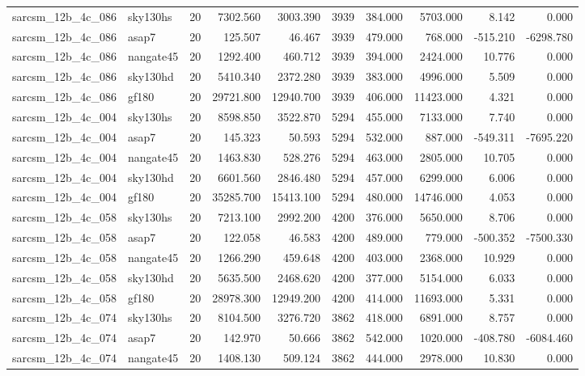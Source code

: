 \documentclass{article}
\begin{document}
\begin{longtable}{llrrrrrrrr}
sarcsm\_12b\_4c\_086 & sky130hs & 20 & 7302.560 & 3003.390 & 3939 & 384.000 & 5703.000 & 8.142 & 0.000 \\
sarcsm\_12b\_4c\_086 & asap7 & 20 & 125.507 & 46.467 & 3939 & 479.000 & 768.000 & -515.210 & -6298.780 \\
sarcsm\_12b\_4c\_086 & nangate45 & 20 & 1292.400 & 460.712 & 3939 & 394.000 & 2424.000 & 10.776 & 0.000 \\
sarcsm\_12b\_4c\_086 & sky130hd & 20 & 5410.340 & 2372.280 & 3939 & 383.000 & 4996.000 & 5.509 & 0.000 \\
sarcsm\_12b\_4c\_086 & gf180 & 20 & 29721.800 & 12940.700 & 3939 & 406.000 & 11423.000 & 4.321 & 0.000 \\
sarcsm\_12b\_4c\_004 & sky130hs & 20 & 8598.850 & 3522.870 & 5294 & 455.000 & 7133.000 & 7.740 & 0.000 \\
sarcsm\_12b\_4c\_004 & asap7 & 20 & 145.323 & 50.593 & 5294 & 532.000 & 887.000 & -549.311 & -7695.220 \\
sarcsm\_12b\_4c\_004 & nangate45 & 20 & 1463.830 & 528.276 & 5294 & 463.000 & 2805.000 & 10.705 & 0.000 \\
sarcsm\_12b\_4c\_004 & sky130hd & 20 & 6601.560 & 2846.480 & 5294 & 457.000 & 6299.000 & 6.006 & 0.000 \\
sarcsm\_12b\_4c\_004 & gf180 & 20 & 35285.700 & 15413.100 & 5294 & 480.000 & 14746.000 & 4.053 & 0.000 \\
sarcsm\_12b\_4c\_058 & sky130hs & 20 & 7213.100 & 2992.200 & 4200 & 376.000 & 5650.000 & 8.706 & 0.000 \\
sarcsm\_12b\_4c\_058 & asap7 & 20 & 122.058 & 46.583 & 4200 & 489.000 & 779.000 & -500.352 & -7500.330 \\
sarcsm\_12b\_4c\_058 & nangate45 & 20 & 1266.290 & 459.648 & 4200 & 403.000 & 2368.000 & 10.929 & 0.000 \\
sarcsm\_12b\_4c\_058 & sky130hd & 20 & 5635.500 & 2468.620 & 4200 & 377.000 & 5154.000 & 6.033 & 0.000 \\
sarcsm\_12b\_4c\_058 & gf180 & 20 & 28978.300 & 12949.200 & 4200 & 414.000 & 11693.000 & 5.331 & 0.000 \\
sarcsm\_12b\_4c\_074 & sky130hs & 20 & 8104.500 & 3276.720 & 3862 & 418.000 & 6891.000 & 8.757 & 0.000 \\
sarcsm\_12b\_4c\_074 & asap7 & 20 & 142.970 & 50.666 & 3862 & 542.000 & 1020.000 & -408.780 & -6084.460 \\
sarcsm\_12b\_4c\_074 & nangate45 & 20 & 1408.130 & 509.124 & 3862 & 444.000 & 2978.000 & 10.830 & 0.000 \\

\end{longtable}
\end{document}
